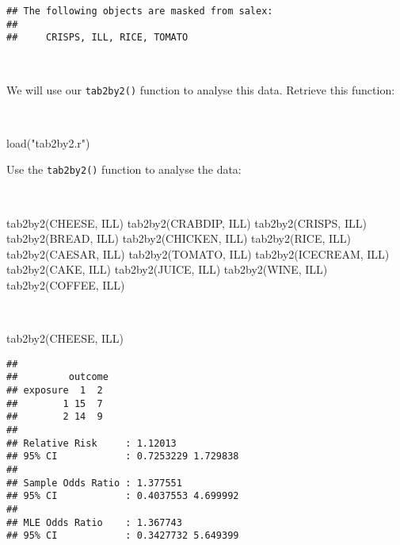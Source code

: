 \documentclass[
  12pt,
  a4paper]{book}
\newenvironment{Shaded}{\begin{snugshade}}{\end{snugshade}}
\newcommand{\FunctionTok}[1]{\textcolor[rgb]{0.00,0.00,0.00}{#1}}
\newcommand{\NormalTok}[1]{#1}
\newcommand{\StringTok}[1]{\textcolor[rgb]{0.31,0.60,0.02}{#1}}
\begin{document}
\begin{verbatim}
## The following objects are masked from salex:
## 
##     CRISPS, ILL, RICE, TOMATO
\end{verbatim}

~

We will use our \texttt{tab2by2()} function to analyse this data. Retrieve this function:

~

\begin{Shaded}
\begin{Highlighting}[]
\FunctionTok{load}\NormalTok{(}\StringTok{"tab2by2.r"}\NormalTok{)}
\end{Highlighting}
\end{Shaded}

\newpage

Use the \texttt{tab2by2()} function to analyse the data:

~

\begin{Shaded}
\begin{Highlighting}[]
\FunctionTok{tab2by2}\NormalTok{(CHEESE, ILL)}
\FunctionTok{tab2by2}\NormalTok{(CRABDIP, ILL)}
\FunctionTok{tab2by2}\NormalTok{(CRISPS, ILL)}
\FunctionTok{tab2by2}\NormalTok{(BREAD, ILL)}
\FunctionTok{tab2by2}\NormalTok{(CHICKEN, ILL)}
\FunctionTok{tab2by2}\NormalTok{(RICE, ILL)}
\FunctionTok{tab2by2}\NormalTok{(CAESAR, ILL)}
\FunctionTok{tab2by2}\NormalTok{(TOMATO, ILL)}
\FunctionTok{tab2by2}\NormalTok{(ICECREAM, ILL)}
\FunctionTok{tab2by2}\NormalTok{(CAKE, ILL)}
\FunctionTok{tab2by2}\NormalTok{(JUICE, ILL)}
\FunctionTok{tab2by2}\NormalTok{(WINE, ILL)}
\FunctionTok{tab2by2}\NormalTok{(COFFEE, ILL)}
\end{Highlighting}
\end{Shaded}

~

\begin{Shaded}
\begin{Highlighting}[]
\FunctionTok{tab2by2}\NormalTok{(CHEESE, ILL)}
\end{Highlighting}
\end{Shaded}

\begin{verbatim}
## 
##         outcome
## exposure  1  2
##        1 15  7
##        2 14  9
## 
## Relative Risk     : 1.12013 
## 95% CI            : 0.7253229 1.729838 
## 
## Sample Odds Ratio : 1.377551 
## 95% CI            : 0.4037553 4.699992 
## 
## MLE Odds Ratio    : 1.367743 
## 95% CI            : 0.3427732 5.649399
\end{verbatim}
\end{document}
